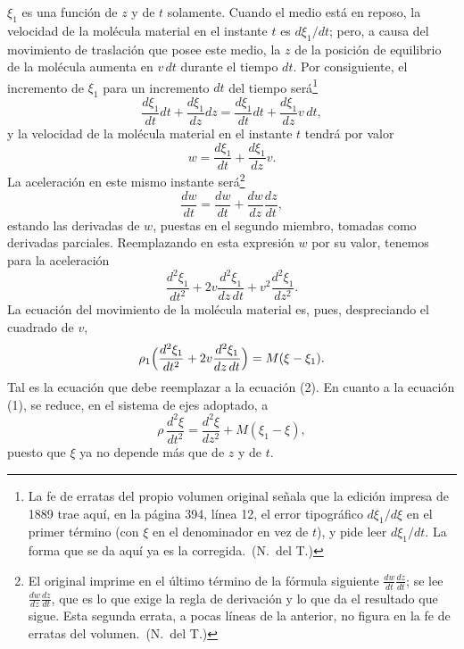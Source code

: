 $\xi_1$ es una función de $z$ y de $t$ solamente. Cuando el medio está en
reposo, la velocidad de la molécula material en el instante $t$ es
$d\xi_1/dt$; pero, a causa del movimiento de traslación que posee este
medio, la $z$ de la posición de equilibrio de la molécula aumenta en
$v\,dt$ durante el tiempo $dt$. Por consiguiente, el incremento de $\xi_1$
para un incremento $dt$ del tiempo será\footnote{La fe de erratas del
propio volumen original señala que la edición impresa de 1889 trae aquí,
en la página 394, línea 12, el error tipográfico $d\xi_1/d\xi$ en el primer
término (con $\xi$ en el denominador en vez de $t$), y pide leer
$d\xi_1/dt$. La forma que se da aquí ya es la corregida.~(N.~del T.)}
\[
\frac{d\xi_1}{dt}dt + \frac{d\xi_1}{dz}dz = \frac{d\xi_1}{dt}dt +
\frac{d\xi_1}{dz}v\,dt,
\]
y la velocidad de la molécula material en el instante $t$ tendrá por valor
\[
w = \frac{d\xi_1}{dt} + \frac{d\xi_1}{dz}v.
\]
La aceleración en este mismo instante será\footnote{El original imprime
en el último término de la fórmula siguiente
$\frac{dw}{dt}\frac{dz}{dt}$; se lee $\frac{dw}{dz}\frac{dz}{dt}$, que es
lo que exige la regla de derivación y lo que da el resultado que sigue.
Esta segunda errata, a pocas líneas de la anterior, no figura en la fe de
erratas del volumen.~(N.~del T.)}
\[
\frac{dw}{dt} = \frac{dw}{dt} + \frac{dw}{dz}\frac{dz}{dt},
\]
estando las derivadas de $w$, puestas en el segundo miembro, tomadas como
derivadas parciales. Reemplazando en esta expresión $w$ por su valor,
tenemos para la aceleración
\[
\frac{d^2\xi_1}{dt^2} + 2v\frac{d^2\xi_1}{dz\,dt} +
v^2\frac{d^2\xi_1}{dz^2}.
\]
La ecuación del movimiento de la molécula material es, pues, despreciando
el cuadrado de $v$,
\begin{equation}
\rho_1\Bigl(\frac{d^2\xi_1}{dt^2} + 2v\frac{d^2\xi_1}{dz\,dt}\Bigr) =
M(\xi-\xi_1).
\end{equation}
Tal es la ecuación que debe reemplazar a la ecuación (2). En cuanto a la
ecuación (1), se reduce, en el sistema de ejes adoptado, a
\begin{equation}
\rho\,\frac{d^2\xi}{dt^2} = \frac{d^2\xi}{dz^2} + M(\xi_1-\xi),
\end{equation}
puesto que $\xi$ ya no depende más que de $z$ y de $t$.

